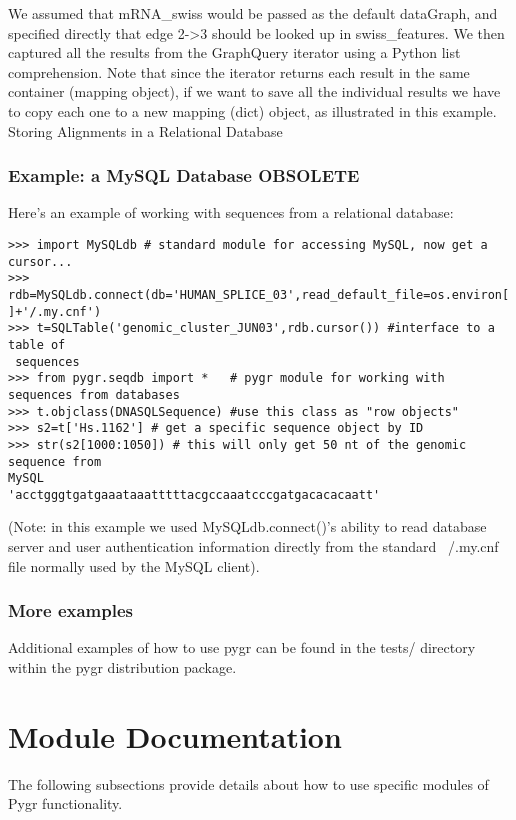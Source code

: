 \documentclass{howto}
\begin{document}
We assumed that mRNA_swiss would be passed as the default dataGraph, and specified directly that edge 2->3 should be looked up in swiss_features.  We then captured all the results from the GraphQuery iterator using a Python list comprehension.  Note that since the iterator returns each result in the same container (mapping object), if we want to save all the individual results we have to copy each one to a new mapping (dict) object, as illustrated in this example.
Storing Alignments in a Relational Database


\subsubsection{Example: a MySQL Database OBSOLETE}
Here's an example of working with sequences from a relational database:

\begin{verbatim}
>>> import MySQLdb # standard module for accessing MySQL, now get a cursor...
>>> rdb=MySQLdb.connect(db='HUMAN_SPLICE_03',read_default_file=os.environ['HOME'
]+'/.my.cnf')
>>> t=SQLTable('genomic_cluster_JUN03',rdb.cursor()) #interface to a table of
 sequences
>>> from pygr.seqdb import *   # pygr module for working with sequences from databases
>>> t.objclass(DNASQLSequence) #use this class as "row objects"
>>> s2=t['Hs.1162'] # get a specific sequence object by ID
>>> str(s2[1000:1050]) # this will only get 50 nt of the genomic sequence from 
MySQL
'acctgggtgatgaaataaatttttacgccaaatcccgatgacacacaatt'
\end{verbatim}

(Note: in this example we used MySQLdb.connect()'s ability to read database 
server and user authentication information directly from the standard ~/.my.cnf file normally used by the MySQL client).

\subsubsection{More examples}
\label{more-exam}

Additional examples of how to use pygr can be found in the tests/ directory within the pygr distribution package.




\section{Module Documentation}
\label{module-doc}

The following subsections provide details about how to use specific
modules of Pygr functionality. 
\end{document}
